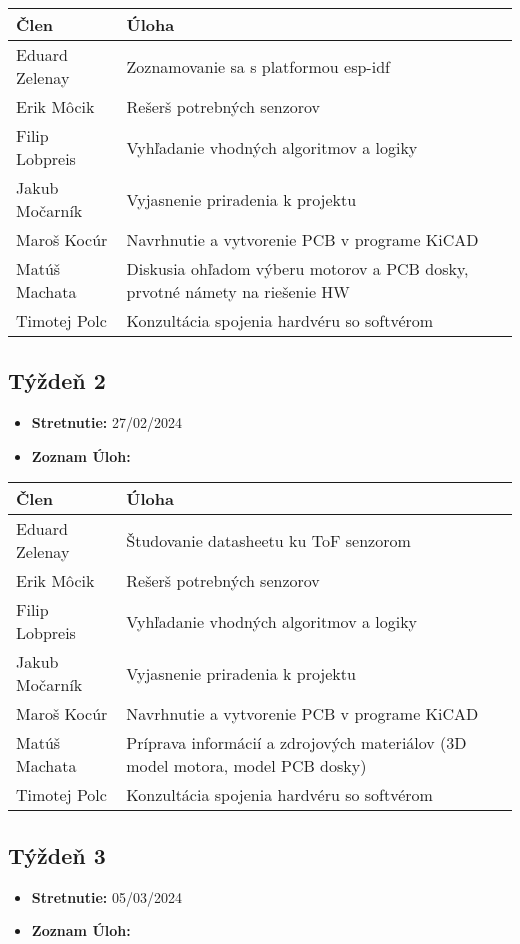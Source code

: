 \begin{tabular}{|l|l|}
    \hline
    \textbf{Člen} & \textbf{Úloha} \\
    \hline
    Eduard Zelenay & Zoznamovanie sa s platformou esp-idf \\
    Erik Môcik & Rešerš potrebných senzorov \\
    Filip Lobpreis & Vyhľadanie vhodných algoritmov a logiky \\
    Jakub Močarník & Vyjasnenie priradenia k projektu\\
    Maroš Kocúr & Navrhnutie a vytvorenie PCB v programe KiCAD \\
    Matúš Machata & Diskusia ohľadom výberu motorov a PCB dosky, prvotné námety na riešenie HW \\
    Timotej Polc & Konzultácia spojenia hardvéru so softvérom \\
    \hline
\end{tabular}
\subsection{Týždeň 2}
\begin{itemize}
    \item \textbf{Stretnutie:} 27/02/2024
    \item \textbf{Zoznam Úloh:}
\end{itemize}

\begin{tabular}{|l|l|}
    \hline
    \textbf{Člen} & \textbf{Úloha} \\
    \hline
    Eduard Zelenay & Študovanie datasheetu ku ToF senzorom \\
    Erik Môcik & Rešerš potrebných senzorov \\
    Filip Lobpreis & Vyhľadanie vhodných algoritmov a logiky \\
    Jakub Močarník & Vyjasnenie priradenia k projektu \\
    Maroš Kocúr & Navrhnutie a vytvorenie PCB v programe KiCAD \\
    Matúš Machata & Príprava informácií a zdrojových materiálov (3D model motora, model PCB dosky) \\
    Timotej Polc & Konzultácia spojenia hardvéru so softvérom \\
    \hline
\end{tabular}
\newpage
\subsection{Týždeň 3}
\begin{itemize}
    \item \textbf{Stretnutie:} 05/03/2024
    \item \textbf{Zoznam Úloh:}
\end{itemize}

